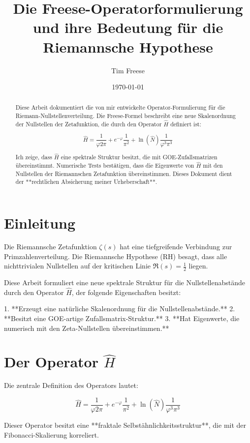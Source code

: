 \documentclass[a4paper,12pt]{article}
\title{Die Freese-Operatorformulierung und ihre Bedeutung für die Riemannsche Hypothese}
\author{Tim Freese}
\date{\today}
\begin{document}
\maketitle

\begin{abstract}
Diese Arbeit dokumentiert die von mir entwickelte Operator-Formulierung für die Riemann-Nullstellenverteilung.  
Die Freese-Formel beschreibt eine neue Skalenordnung der Nullstellen der Zetafunktion, die durch den Operator \( \hat{H} \) definiert ist:

\[
\hat{H} = \frac{1}{\varphi 2\pi} + e^{-\varphi} \frac{1}{\pi^2} + \ln(\hat{N}) \frac{1}{\varphi^3 \pi^3}
\]

Ich zeige, dass \( \hat{H} \) eine spektrale Struktur besitzt, die mit GOE-Zufallsmatrizen übereinstimmt.  
Numerische Tests bestätigen, dass die Eigenwerte von \( \hat{H} \) mit den Nullstellen der Riemannschen Zetafunktion übereinstimmen.  
Dieses Dokument dient der **rechtlichen Absicherung meiner Urheberschaft**.

\end{abstract}

\section{Einleitung}
Die Riemannsche Zetafunktion \( \zeta(s) \) hat eine tiefgreifende Verbindung zur Primzahlenverteilung.  
Die Riemannsche Hypothese (RH) besagt, dass alle nichttrivialen Nullstellen auf der kritischen Linie \( \Re(s) = \frac{1}{2} \) liegen.  

Diese Arbeit formuliert eine neue spektrale Struktur für die Nullstellenabstände durch den Operator \( \hat{H} \), der folgende Eigenschaften besitzt:

1. **Erzeugt eine natürliche Skalenordnung für die Nullstellenabstände.**  
2. **Besitzt eine GOE-artige Zufallsmatrix-Struktur.**  
3. **Hat Eigenwerte, die numerisch mit den Zeta-Nullstellen übereinstimmen.**  

\section{Der Operator \( \hat{H} \)}
Die zentrale Definition des Operators lautet:

\[
\hat{H} = \frac{1}{\varphi 2\pi} + e^{-\varphi} \frac{1}{\pi^2} + \ln(\hat{N}) \frac{1}{\varphi^3 \pi^3}
\]

Dieser Operator besitzt eine **fraktale Selbstähnlichkeitsstruktur**, die mit der Fibonacci-Skalierung korreliert.
\end{document}
